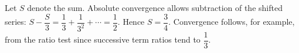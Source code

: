 Let $S$ denote the sum. Absolute convergence allows subtraction of the shifted series: $S-\dfrac{S}{3}=\dfrac{1}{3}+\dfrac{1}{3^2}+\cdots=\dfrac{1}{2}$. Hence $\boxed{S=\dfrac{3}{4}}$. Convergence follows, for example, from the ratio test since successive term ratios tend to $\dfrac{1}{3}$.
